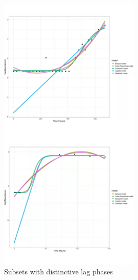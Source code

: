 \documentclass[11pt, a4paper]{article}
\begin{document}
\begin{figure}[H]
    \centering
    \includegraphics[width=0.6\textwidth]{figure4}
    \caption{Subsets with distinctive lag phases}
    \label{figure4}
\end{figure}
\end{document}
